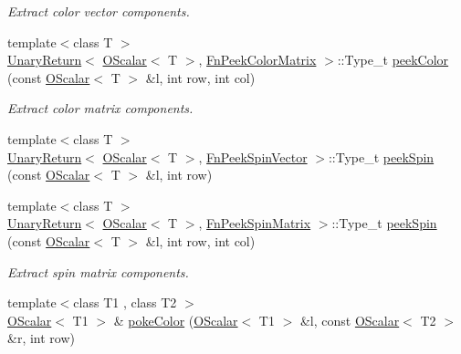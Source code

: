 \begin{DoxyCompactItemize}
\begin{DoxyCompactList}\small\item\em Extract color vector components. \end{DoxyCompactList}\item 
{\footnotesize template$<$class T $>$ }\\\mbox{\hyperlink{structENSEM_1_1UnaryReturn}{Unary\+Return}}$<$ \mbox{\hyperlink{classENSEM_1_1OScalar}{O\+Scalar}}$<$ T $>$, \mbox{\hyperlink{structENSEM_1_1FnPeekColorMatrix}{Fn\+Peek\+Color\+Matrix}} $>$\+::Type\+\_\+t \mbox{\hyperlink{group__obsscalar_gabb496d1fb0c0682ec483697e6dae0e32}{peek\+Color}} (const \mbox{\hyperlink{classENSEM_1_1OScalar}{O\+Scalar}}$<$ T $>$ \&l, int row, int col)
\begin{DoxyCompactList}\small\item\em Extract color matrix components. \end{DoxyCompactList}\item 
{\footnotesize template$<$class T $>$ }\\\mbox{\hyperlink{structENSEM_1_1UnaryReturn}{Unary\+Return}}$<$ \mbox{\hyperlink{classENSEM_1_1OScalar}{O\+Scalar}}$<$ T $>$, \mbox{\hyperlink{structENSEM_1_1FnPeekSpinVector}{Fn\+Peek\+Spin\+Vector}} $>$\+::Type\+\_\+t \mbox{\hyperlink{group__obsscalar_gad99eae88a001d667225b11a6f8b73d7e}{peek\+Spin}} (const \mbox{\hyperlink{classENSEM_1_1OScalar}{O\+Scalar}}$<$ T $>$ \&l, int row)
\item 
{\footnotesize template$<$class T $>$ }\\\mbox{\hyperlink{structENSEM_1_1UnaryReturn}{Unary\+Return}}$<$ \mbox{\hyperlink{classENSEM_1_1OScalar}{O\+Scalar}}$<$ T $>$, \mbox{\hyperlink{structENSEM_1_1FnPeekSpinMatrix}{Fn\+Peek\+Spin\+Matrix}} $>$\+::Type\+\_\+t \mbox{\hyperlink{group__obsscalar_ga9ce0c024aa13d3c00740b9a82d2912db}{peek\+Spin}} (const \mbox{\hyperlink{classENSEM_1_1OScalar}{O\+Scalar}}$<$ T $>$ \&l, int row, int col)
\begin{DoxyCompactList}\small\item\em Extract spin matrix components. \end{DoxyCompactList}\item 
{\footnotesize template$<$class T1 , class T2 $>$ }\\\mbox{\hyperlink{classENSEM_1_1OScalar}{O\+Scalar}}$<$ T1 $>$ \& \mbox{\hyperlink{group__obsscalar_ga0a369092bcae6deacc6b6a1a5177ddb1}{poke\+Color}} (\mbox{\hyperlink{classENSEM_1_1OScalar}{O\+Scalar}}$<$ T1 $>$ \&l, const \mbox{\hyperlink{classENSEM_1_1OScalar}{O\+Scalar}}$<$ T2 $>$ \&r, int row)

\end{DoxyCompactItemize}
